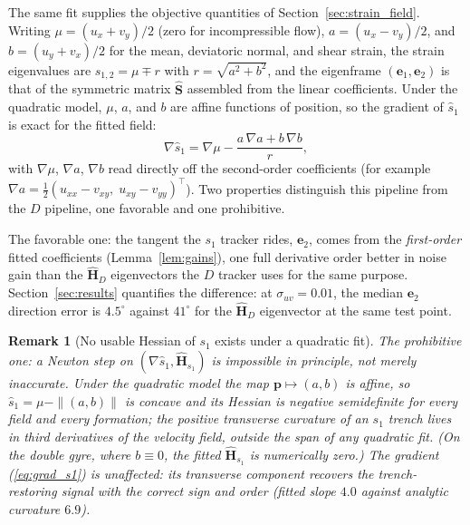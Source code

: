 \documentclass[lettersize,journal]{IEEEtran}
\newtheorem{remark}{Remark}
\begin{document}
The same fit supplies the objective quantities of
Section~\ref{sec:strain_field}. Writing $\mu = (u_x + v_y)/2$ (zero for
incompressible flow), $a = (u_x - v_y)/2$, and $b = (u_y + v_x)/2$ for
the mean, deviatoric normal, and shear strain, the strain eigenvalues
are $s_{1,2} = \mu \mp r$ with $r = \sqrt{a^2 + b^2}$, and the
eigenframe $(\mathbf{e}_1, \mathbf{e}_2)$ is that of the symmetric
matrix $\hat{\mathbf{S}}$ assembled from the linear coefficients. Under
the quadratic model, $\mu$, $a$, and $b$ are affine functions of
position, so the gradient of $\hat{s}_1$ is exact for the fitted field:
\begin{equation}
    \nabla \hat{s}_1 = \nabla\mu
    - \frac{a\,\nabla a + b\,\nabla b}{r},
    \label{eq:grad_s1}
\end{equation}
with $\nabla\mu$, $\nabla a$, $\nabla b$ read directly off the
second-order coefficients (for example $\nabla a = \tfrac{1}{2}(u_{xx} -
v_{xy},\; u_{xy} - v_{yy})^\top$). Two properties distinguish this
pipeline from the $D$ pipeline, one favorable and one prohibitive.

The favorable one: the tangent the $s_1$ tracker rides,
$\mathbf{e}_2$, comes from the \emph{first-order} fitted coefficients
(Lemma~\ref{lem:gains}), one full derivative order better in noise gain
than the $\hat{\mathbf{H}}_D$ eigenvectors the $D$ tracker uses for the
same purpose. Section~\ref{sec:results} quantifies the difference: at
$\sigma_{uv} = 0.01$, the median $\mathbf{e}_2$ direction error is
$4.5^\circ$ against $41^\circ$ for the $\hat{\mathbf{H}}_D$ eigenvector
at the same test point.

\begin{remark}[No usable Hessian of $s_1$ exists under a quadratic fit]
\label{rem:s1hess}
The prohibitive one: a Newton step on $(\nabla \hat{s}_1,
\hat{\mathbf{H}}_{s_1})$ is impossible in principle, not merely
inaccurate. Under the quadratic model the map $\mathbf{p} \mapsto (a,
b)$ is affine, so $\hat{s}_1 = \mu - \|(a, b)\|$ is concave and its
Hessian is negative semidefinite \emph{for every field and every
formation}; the positive transverse curvature of an $s_1$ trench lives
in third derivatives of the velocity field, outside the span of any
quadratic fit. (On the double gyre, where $b \equiv 0$, the fitted
$\hat{\mathbf{H}}_{s_1}$ is numerically zero.) The gradient
(\ref{eq:grad_s1}) is unaffected: its transverse component recovers the
trench-restoring signal with the correct sign and order (fitted slope
$4.0$ against analytic curvature $6.9$).
\end{remark}
\end{document}
